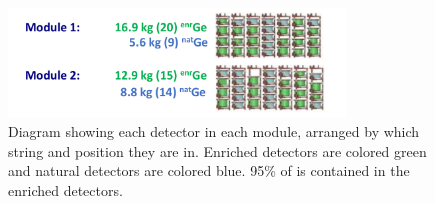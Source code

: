 \documentclass[/main.tex]{subfiles}
\begin{document}
\begin{figure}[h]
  \centering
  \includegraphics[width=0.8\textwidth]{enrnatdets}
  \caption[Module 1 and Module 2 enriched and natural detectors]{\label{fig:Ge76BBLevelDiagram}
    Diagram showing each detector in each module, arranged by which string and position they are in. Enriched detectors are colored green and natural detectors are colored blue. 95\% of  is contained in the enriched detectors.}
\end{figure}
\end{document}
